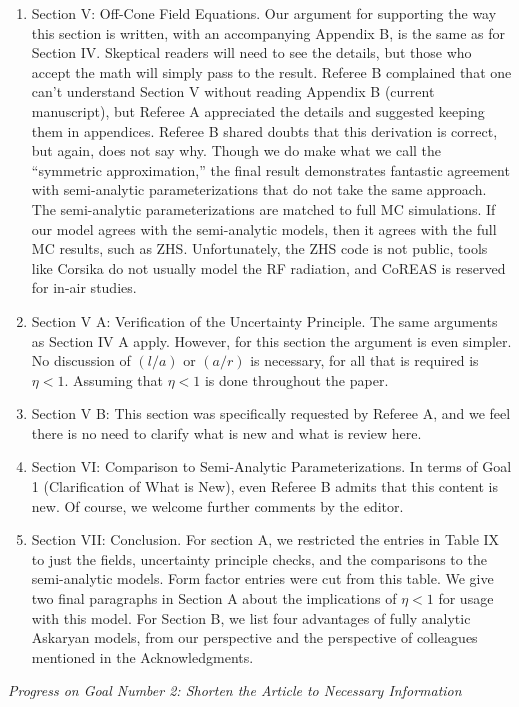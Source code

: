 \documentclass[12pt]{article}
\begin{document}
\begin{enumerate}
\item Section V: Off-Cone Field Equations.  Our argument for supporting the way this section is written, with an accompanying Appendix B, is the same as for Section IV.  Skeptical readers will need to see the details, but those who accept the math will simply pass to the result.  Referee B complained that one can't understand Section V without reading Appendix B (current manuscript), but Referee A appreciated the details and suggested keeping them in appendices.  Referee B shared doubts that this derivation is correct, but again, does not say why.  Though we do make what we call the ``symmetric approximation,'' the final result demonstrates fantastic agreement with semi-analytic parameterizations that do not take the same approach.  The semi-analytic parameterizations are matched to full MC simulations.  If our model agrees with the semi-analytic models, then it agrees with the full MC results, such as ZHS.  Unfortunately, the ZHS code is not public, tools like Corsika do not usually model the RF radiation, and CoREAS is reserved for in-air studies.
\item Section V A: Verification of the Uncertainty Principle.  The same arguments as Section IV A apply.  However, for this section the argument is even simpler.  No discussion of $(l/a)$ or $(a/r)$ is necessary, for all that is required is $\eta < 1$.  Assuming that $\eta < 1$ is done throughout the paper.
\item Section V B: This section was specifically requested by Referee A, and we feel there is no need to clarify what is new and what is review here.
\item Section VI: Comparison to Semi-Analytic Parameterizations.  In terms of Goal 1 (Clarification of What is New), even Referee B admits that this content is new.  Of course, we welcome further comments by the editor.
\item Section VII: Conclusion.  For section A, we restricted the entries in Table IX to just the fields, uncertainty principle checks, and the comparisons to the semi-analytic models.  Form factor entries were cut from this table.  We give two final paragraphs in Section A about the implications of $\eta < 1$ for usage with this model.  For Section B, we list four advantages of fully analytic Askaryan models, from our perspective and the perspective of colleagues mentioned in the Acknowledgments.
\end{enumerate}

\textit{Progress on Goal Number 2: Shorten the Article to Necessary Information}
\end{document}

